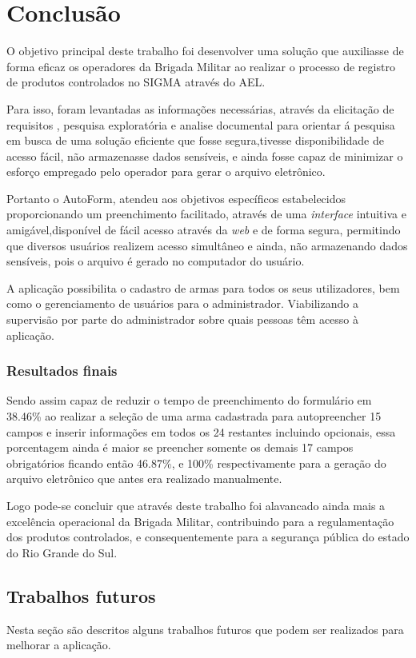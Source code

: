 \chapter{Conclusão}
O objetivo principal deste trabalho foi desenvolver uma solução que auxiliasse de forma eficaz os operadores da Brigada Militar ao realizar o processo de registro de produtos controlados no SIGMA através do AEL.

Para isso, foram levantadas as informações necessárias, através da elicitação de requisitos , pesquisa exploratória e analise documental para orientar á pesquisa em busca de uma solução eficiente que fosse segura,tivesse disponibilidade de acesso fácil, não armazenasse dados sensíveis, e ainda fosse capaz de minimizar o esforço empregado pelo operador para gerar o arquivo eletrônico.

Portanto o AutoForm, atendeu aos objetivos específicos estabelecidos proporcionando um preenchimento facilitado, através de uma \textit{interface} intuitiva e amigável,disponível de fácil acesso através da \textit{web} e de forma segura, permitindo que diversos usuários realizem acesso simultâneo e ainda, não armazenando dados sensíveis, pois o arquivo é gerado no computador do usuário.

A aplicação possibilita o cadastro de armas para todos os seus utilizadores, bem como o gerenciamento de usuários para o administrador. Viabilizando a supervisão por parte do administrador sobre quais pessoas têm acesso à aplicação.

\subsection{Resultados finais}

Sendo assim capaz de reduzir o tempo de preenchimento do formulário em 38.46\% ao realizar a seleção de uma arma cadastrada para autopreencher 15 campos e inserir informações em todos os 24 restantes incluindo opcionais, essa porcentagem ainda é maior se preencher somente os demais 17 campos obrigatórios ficando então 46.87\%, e 100\% respectivamente para a geração do arquivo eletrônico que antes era realizado manualmente.

Logo pode-se concluir que através deste trabalho foi alavancado ainda mais a excelência operacional da Brigada Militar, contribuindo para a regulamentação dos produtos controlados, e consequentemente para a segurança pública do estado do Rio Grande do Sul.

\section{Trabalhos futuros}
Nesta seção são descritos alguns trabalhos futuros que podem ser realizados para melhorar a aplicação.

